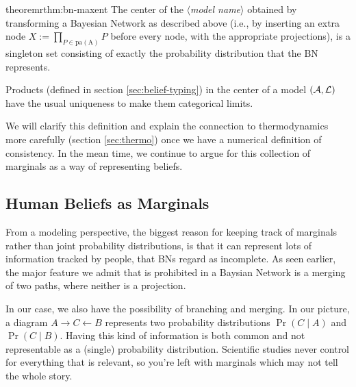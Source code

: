 \documentclass{article}
\newcommand\modelname{{\color{blue!50!black}$\langle$\itshape model name$\rangle$ }}
\begin{document}
	
	\begin{restatable}{theorem}{rthm:bn-maxent} \label{rthm:bn-maxent}
		The center of the \modelname obtained by transforming a Bayesian Network as described above (i.e., by inserting an extra node $X := \prod_{P \in \mathrm{pa(A)}} P$ before every node, with the appropriate projections), is a singleton set consisting of exactly the probability distribution that the BN represents.
	\end{restatable}

	\begin{coro}
		Products (defined in section \ref{sec:belief-typing}) in the center of a model $(\cal A, L)$ have the usual uniqueness to make them categorical limits.
	\end{coro}

	We will clarify this definition and explain the connection to thermodynamics more carefully (section \ref{sec:thermo}) once we have a numerical definition of consistency. In the mean time, we continue to argue for this collection of marginals as a way of representing beliefs.

	
	
	\subsection{Human Beliefs as Marginals}\label{sec:human-belief-marginals}
	From a modeling perspective, the biggest reason for keeping track of marginals rather than joint probability distributions, is that it can represent lots of information tracked by people, that BNs regard as incomplete. As seen earlier, the major feature we admit that is prohibited in a Baysian Network is a merging of two paths, where neither is a projection.
	
	In our case, we also have the possibility of branching and merging. In our picture, a diagram $A \rightarrow C \leftarrow B$ represents two probability distributions $\Pr(C\mid A)$ and $\Pr(C \mid B)$.
	Having this kind of information is both common and not representable as a (single) probability distribution. Scientific studies never control for everything that is relevant, so you're left with marginals which may not tell the whole story.
	
\end{document}
